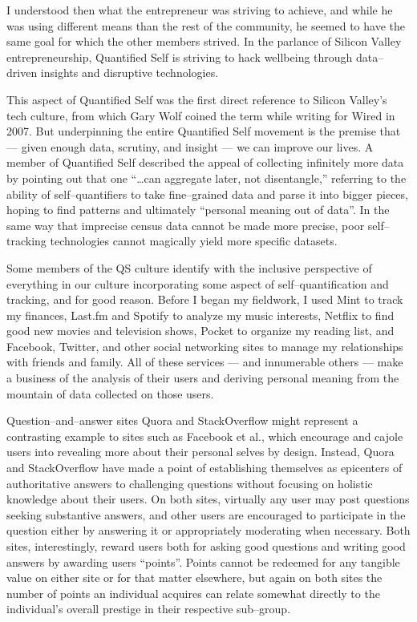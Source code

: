 \documentclass{article}
\begin{document}
I understood then what the entrepreneur was striving to achieve,
and while he was using different means than the rest of the community,
he seemed to have the same goal for which the other members strived.
In the parlance of Silicon Valley entrepreneurship,
Quantified Self is striving to hack wellbeing through data--driven insights and disruptive technologies.

This aspect of Quantified Self was the first direct reference to Silicon Valley's tech culture,
from which Gary Wolf coined the term while writing for Wired in 2007.
But underpinning the entire Quantified Self movement is the premise that
--- given enough data,
scrutiny,
and insight
--- we can improve our lives.
A member of Quantified Self described the appeal of collecting infinitely more data by pointing out that one ``\dots can aggregate later,
not disentangle,'' referring to the ability of self--quantifiers to take fine--grained data and parse it into bigger pieces,
hoping to find patterns and ultimately ``personal meaning out of data''.
In the same way that imprecise census data cannot be made more precise,
poor self--tracking technologies cannot magically yield more specific datasets.

Some members of the QS culture identify with the inclusive perspective of everything in our culture incorporating some aspect of self--quantification and tracking,
and for good reason.
Before I began my fieldwork,
I used Mint to track my finances,
Last.fm and Spotify to analyze my music interests,
Netflix to find good new movies and television shows,
Pocket to organize my reading list,
and Facebook,
Twitter,
and other social networking sites to manage my relationships with friends and family.
All of these services
--- and innumerable others ---
make a business of the analysis of their users and deriving personal meaning from the mountain of data collected on those users.

Question--and--answer sites Quora and StackOverflow might represent a contrasting example to sites such as Facebook et al.,
which encourage and cajole users into revealing more about their personal selves by design.
Instead,
Quora and StackOverflow have made a point of establishing themselves as epicenters of authoritative answers to challenging questions without focusing on holistic knowledge about their users.
On both sites,
virtually any user may post questions seeking substantive answers,
and other users are encouraged to participate in the question either by answering it or appropriately moderating when necessary.
Both sites,
interestingly,
reward users both for asking good questions and writing good answers by awarding users ``points''.
Points cannot be redeemed for any tangible value on either site or for that matter elsewhere,
but again on both sites the number of points an individual acquires can relate somewhat directly to the individual's overall prestige in their respective sub--group.
\end{document}
